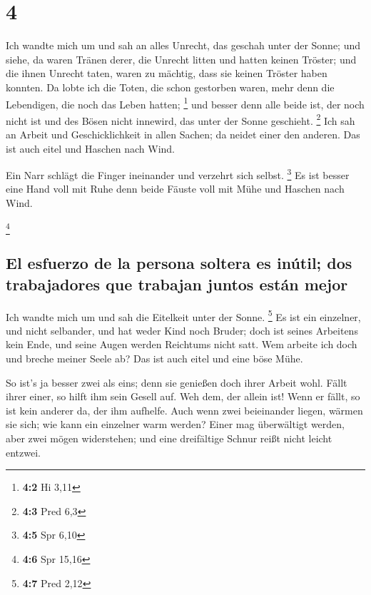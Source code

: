 \hypertarget{section-3}{%
\section{4}\label{section-3}}

 Ich wandte mich um und sah an alles Unrecht, das geschah
unter der Sonne; und siehe, da waren Tränen derer, die Unrecht litten
und hatten keinen Tröster; und die ihnen Unrecht taten, waren zu
mächtig, dass sie keinen Tröster haben konnten.  Da lobte
ich die Toten, die schon gestorben waren, mehr denn die Lebendigen, die
noch das Leben hatten; \footnote{\textbf{4:2} Hi 3,11} 
und besser denn alle beide ist, der noch nicht ist und des Bösen nicht
innewird, das unter der Sonne geschieht. \footnote{\textbf{4:3} Pred 6,3}
 Ich sah an Arbeit und Geschicklichkeit in allen Sachen;
da neidet einer den anderen. Das ist auch eitel und Haschen nach Wind.

 Ein Narr schlägt die Finger ineinander und verzehrt sich
selbst. \footnote{\textbf{4:5} Spr 6,10}  Es ist besser
eine Hand voll mit Ruhe denn beide Fäuste voll mit Mühe und Haschen nach
Wind.

\footnote{\textbf{4:6} Spr 15,16}

\hypertarget{el-esfuerzo-de-la-persona-soltera-es-inuxfatil-dos-trabajadores-que-trabajan-juntos-estuxe1n-mejor}{%
\subsection{El esfuerzo de la persona soltera es inútil; dos
trabajadores que trabajan juntos están
mejor}\label{el-esfuerzo-de-la-persona-soltera-es-inuxfatil-dos-trabajadores-que-trabajan-juntos-estuxe1n-mejor}}

 Ich wandte mich um und sah die Eitelkeit unter der Sonne.
\footnote{\textbf{4:7} Pred 2,12}  Es ist ein einzelner,
und nicht selbander, und hat weder Kind noch Bruder; doch ist seines
Arbeitens kein Ende, und seine Augen werden Reichtums nicht satt. Wem
arbeite ich doch und breche meiner Seele ab? Das ist auch eitel und eine
böse Mühe.

 So ist's ja besser zwei als eins; denn sie genießen doch
ihrer Arbeit wohl.  Fällt ihrer einer, so hilft ihm sein
Gesell auf. Weh dem, der allein ist! Wenn er fällt, so ist kein anderer
da, der ihm aufhelfe.  Auch wenn zwei beieinander liegen,
wärmen sie sich; wie kann ein einzelner warm werden? 
Einer mag überwältigt werden, aber zwei mögen widerstehen; und eine
dreifältige Schnur reißt nicht leicht entzwei.

